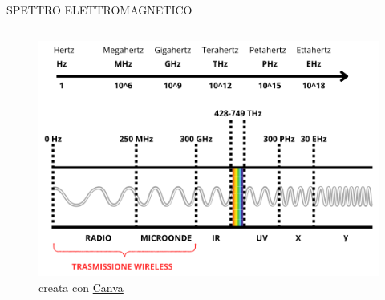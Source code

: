 \documentclass[aspectratio=1610,handout]{beamer}
\begin{document}
\begin{frame}{SPETTRO ELETTROMAGNETICO}
    \begin{columns}
        \begin{figure}
            \includegraphics[width=\textwidth]{img/Spettro_Elettromagnetico.png}
            \caption{{creata con \href{https://www.canva.com/}{Canva}}}
        \end{figure}
    \end{columns}
\end{frame}
\end{document}
